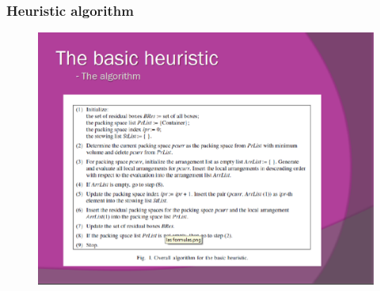 \documentclass{beamer}
\begin{document}
\begin{frame}
\frametitle{Heuristic algorithm }
\begin{figure}[!th]
\begin{center}
\includegraphics[width=1\textwidth]{img/picn5.eps}
\end{center}
\end{figure}
\end{frame}
\end{document}
